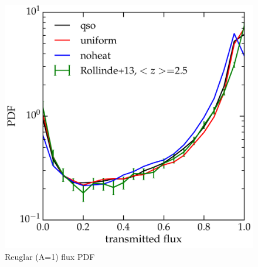 \documentclass[numberedappendix]{emulateapj}
\begin{document}
\begin{figure}[h]
\centering
\includegraphics[width = .9\textwidth ]{flux_PDF_Rollinde_25.pdf}
\caption{Reuglar (A=1) flux PDF }
\label{fig:fluxPDF}
\end{figure}

\begin{acknowledgements}
\end{acknowledgements}




\end{document}
